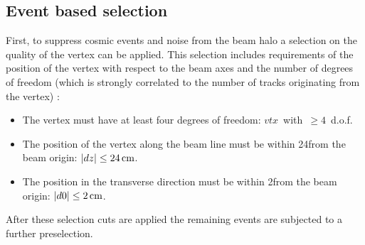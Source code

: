 \subsection*{Event based selection}
First, to suppress cosmic events and noise from the beam halo a selection on the quality of the vertex can be applied.
This selection includes requirements of the position of the vertex with respect to the beam axes and the number of degrees of freedom (which is strongly correlated to the number of tracks originating from the vertex) \cite{bib:CMS:Tracking_7TeV_PAS}:  
\begin{itemize}
\renewcommand{\labelitemi}{\footnotesize{\ding{118}}}
\item The vertex must have at least four degrees of freedom: \mbox{$vtx$ with $\geq 4$ d.o.f.}
\item The position of the vertex along the beam line must be within 24\cm from the beam origin: \mbox{$|dz| \leq 24\,\text{cm}$.}
\item The position in the transverse direction must be within 2\cm from the beam origin: \mbox{$|d0| \leq 2\,\text{cm}$.}
\end{itemize}
After these selection cuts are applied the remaining events are subjected to a further preselection.\\


